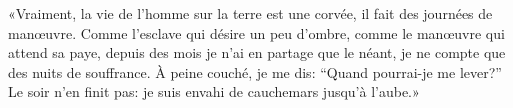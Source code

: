 «Vraiment, la vie de l’homme sur la terre est une corvée,
	il fait des journées de manœuvre.
Comme l’esclave qui désire un peu d’ombre, comme le manœuvre qui attend sa paye,
	depuis des mois je n’ai en partage que le néant,
	je ne compte que des nuits de souffrance.
À peine couché, je me dis: “Quand pourrai-je me lever?”
Le soir n’en finit pas: je suis envahi de cauchemars jusqu’à l’aube.»
